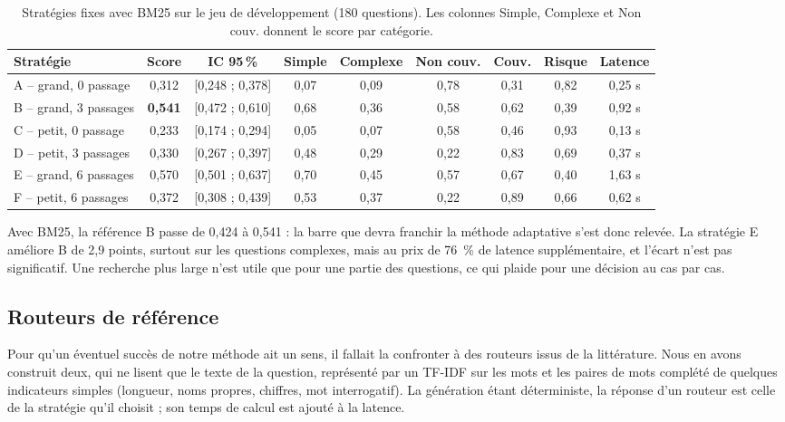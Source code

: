 \documentclass[11pt,a4paper]{article}
\begin{document}
\begin{table}[H]
\centering\footnotesize\setlength{\tabcolsep}{4pt}
\begin{tabular}{l c c c c c c c c}
\toprule
\textbf{Stratégie} & \textbf{Score} & \textbf{IC 95\,\%} & \textbf{Simple} & \textbf{Complexe} & \textbf{Non couv.} & \textbf{Couv.} & \textbf{Risque} & \textbf{Latence} \\
\midrule
A -- grand, 0 passage   & 0,312 & [0,248 ; 0,378] & 0,07 & 0,09 & 0,78 & 0,31 & 0,82 & 0,25 s \\
B -- grand, 3 passages  & \textbf{0,541} & [0,472 ; 0,610] & 0,68 & 0,36 & 0,58 & 0,62 & 0,39 & 0,92 s \\
C -- petit, 0 passage   & 0,233 & [0,174 ; 0,294] & 0,05 & 0,07 & 0,58 & 0,46 & 0,93 & 0,13 s \\
D -- petit, 3 passages  & 0,330 & [0,267 ; 0,397] & 0,48 & 0,29 & 0,22 & 0,83 & 0,69 & 0,37 s \\
E -- grand, 6 passages  & 0,570 & [0,501 ; 0,637] & 0,70 & 0,45 & 0,57 & 0,67 & 0,40 & 1,63 s \\
F -- petit, 6 passages  & 0,372 & [0,308 ; 0,439] & 0,53 & 0,37 & 0,22 & 0,89 & 0,66 & 0,62 s \\
\bottomrule
\end{tabular}
\caption{Stratégies fixes avec BM25 sur le jeu de développement (180 questions). Les colonnes Simple,
Complexe et Non couv. donnent le score par catégorie.}
\label{tab:strategies}
\end{table}

Avec BM25, la référence B passe de 0,424 à 0,541 : la barre que devra franchir la méthode adaptative
s'est donc relevée. La stratégie E améliore B de 2,9 points, surtout sur les questions complexes, mais
au prix de 76~\% de latence supplémentaire, et l'écart n'est pas significatif. Une recherche plus large
n'est utile que pour une partie des questions, ce qui plaide pour une décision au cas par cas.

\subsection{Routeurs de référence}

Pour qu'un éventuel succès de notre méthode ait un sens, il fallait la confronter à des routeurs issus
de la littérature. Nous en avons construit deux, qui ne lisent que le texte de la question, représenté
par un TF-IDF sur les mots et les paires de mots complété de quelques indicateurs simples (longueur,
noms propres, chiffres, mot interrogatif). La génération étant déterministe, la réponse d'un routeur
est celle de la stratégie qu'il choisit ; son temps de calcul est ajouté à la latence.
\end{document}
